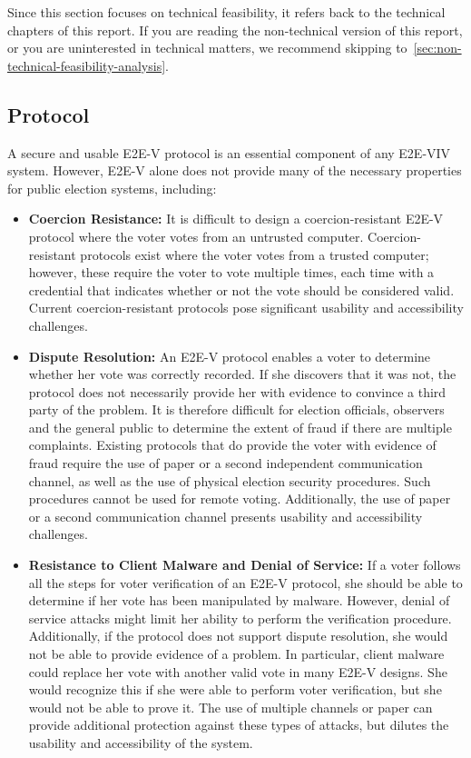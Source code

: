 Since this section focuses on technical feasibility, it refers back to
the technical chapters of this report.  If you are reading the
non-technical version of this report, or you are uninterested in
technical matters, we recommend skipping
to~\autoref{sec:non-technical-feasibility-analysis}.

\subsection{Protocol}

A secure and usable E2E-V protocol is an essential component of any
E2E-VIV system. However, E2E-V alone does not provide many of the
necessary properties for public election systems, including:

\begin{itemize}
\item \textbf{Coercion Resistance:} It is difficult to design a
  coercion-resistant E2E-V protocol where the voter votes from an
  untrusted computer. Coercion-resistant protocols exist where the
  voter votes from a trusted computer; however, these require the
  voter to vote multiple times, each time with a credential that
  indicates whether or not the vote should be considered
  valid. Current coercion-resistant protocols pose significant
  usability and accessibility challenges.

\item \textbf{Dispute Resolution:} An E2E-V protocol enables a voter
  to determine whether her vote was correctly recorded. If she
  discovers that it was not, the protocol does not necessarily provide
  her with evidence to convince a third party of the problem. It is
  therefore difficult for election officials, observers and the
  general public to determine the extent of fraud if there are
  multiple complaints. Existing protocols that do provide the voter
  with evidence of fraud require the use of paper or a second
  independent communication channel, as well as the use of physical
  election security procedures. Such procedures cannot be used for
  remote voting. Additionally, the use of paper or a second
  communication channel presents usability and accessibility
  challenges.

\item \textbf{Resistance to Client Malware and Denial of Service:} If
  a voter follows all the steps for voter verification of an E2E-V
  protocol, she should be able to determine if her vote has been
  manipulated by malware. However, denial of service attacks might
  limit her ability to perform the verification
  procedure. Additionally, if the protocol does not support dispute
  resolution, she would not be able to provide evidence of a
  problem. In particular, client malware could replace her vote with
  another valid vote in many E2E-V designs. She would recognize this
  if she were able to perform voter verification, but she would not be
  able to prove it. The use of multiple channels or paper can provide
  additional protection against these types of attacks, but dilutes the
  usability and accessibility of the system.


\end{itemize}
